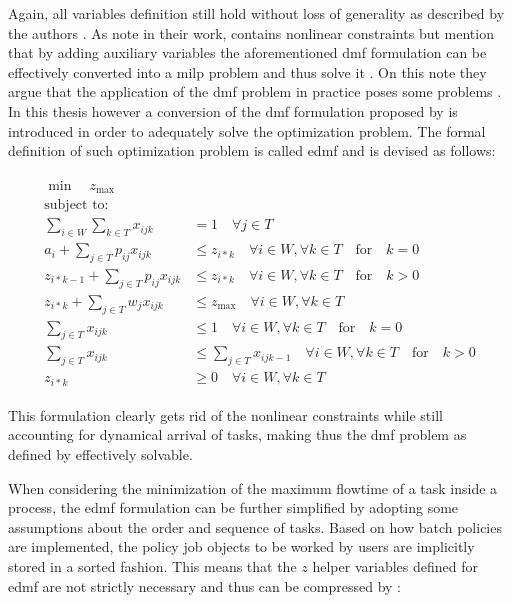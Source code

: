 Again, all variables definition still hold without loss of generality as described by the authors \citep[p. 6]{Zeng2005}. As \citet{Zeng2005} note in their work,  contains nonlinear constraints but mention that by adding auxiliary variables the aforementioned \gls{dmf} formulation can be effectively converted into a \gls{milp} problem and thus solve it \citep[p. 6]{Zeng2005}. On this note they argue that the application of the \gls{dmf} problem in practice poses some problems \citep{Zeng2005}. In this thesis however a conversion of the \gls{dmf} formulation proposed by \citet{Zeng2005} is introduced in order to adequately solve the optimization problem. The formal definition of such optimization problem is called \gls{edmf} and is devised as follows:

\begin{align}
	\begin{split}
	    \min \quad z_{\text{max}}\\
	    \text{subject to:} \\
	    \sum_{i \in W} \sum_{k \in T} x_{ijk} &= 1 \quad \forall j \in T\\
	    a_i + \sum_{j \in T} p_{ij} x_{ijk} &\leq z_{i*k} \quad \forall i \in W, \forall k \in T \quad \text{for} \quad k=0\\
	    z_{i*k-1} + \sum_{j \in T} p_{ij} x_{ijk} &\leq z_{i*k} \quad \forall i \in W, \forall k \in T \quad \text{for} \quad k>0\\
	    z_{i*k}+ \sum_{j \in T} w_j x_{ijk} &\leq z_{\text{max}} \quad \forall i \in W, \forall k \in T\\
	    \sum_{j \in T} x_{ijk} &\leq 1 \quad \forall i \in W, \forall k \in T \quad \text{for} \quad k=0\\
	    \sum_{j \in T} x_{ijk} &\leq \sum_{j \in T} x_{ijk-1} \quad \forall i \in W, \forall k \in T \quad \text{for} \quad k>0\\
	    z_{i*k} &\geq 0 \quad \forall i \in W, \forall k \in T
	\end{split}
\end{align}

This formulation clearly gets rid of the nonlinear constraints while still accounting for dynamical arrival of tasks, making thus the \gls{dmf} problem as defined by \citet{Zeng2005} effectively solvable.

When considering the minimization of the maximum flowtime of a task inside a process, the \gls{edmf} formulation can be further simplified by adopting some assumptions about the order and sequence of tasks. Based on how batch policies are implemented, the policy job objects to be worked by users are implicitly stored in a sorted fashion. This means that the $z$ helper variables defined for \gls{edmf} are not strictly necessary and thus can be compressed by :

